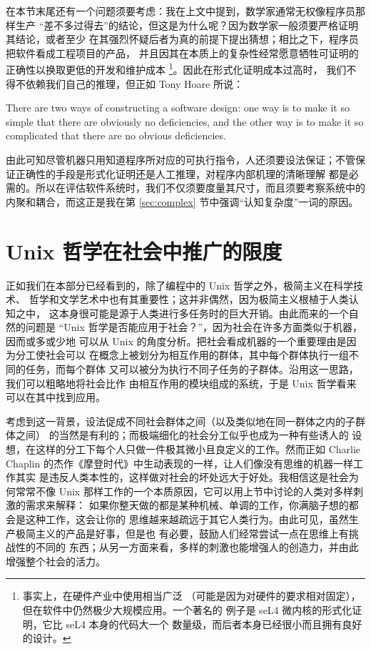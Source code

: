 在本节末尾还有一个问题须要考虑：我在上文中提到，数学家通常无权像程序员那样生产
“差不多过得去”的结论，但这是为什么呢？因为数学家一般须要严格证明其结论，或者至少
在其强烈怀疑后者为真的前提下提出猜想；相比之下，程序员把软件看成工程项目的产品，
并且因其在本质上的复杂性经常愿意牺牲可证明的正确性以换取更低的开发和维护成本%
\footnote{\label{fn:formal}事实上，在硬件产业中使用相当广泛
（可能是因为对硬件的要求相对固定），但在软件中仍然极少大规模应用。一个著名的
例子是 seL4 微内核的形式化证明，它比 seL4 本身的代码大一个
数量级，而后者本身已经很小而且拥有良好的设计。}。因此在形式化证明成本过高时，
我们不得不依赖我们自己的推理，但正如 Tony Hoare 所说：
\begin{quoting}
	There are two ways of constructing a software design: one way is to make
	it so simple that there are obviously no deficiencies, and the other way
	is to make it so complicated that there are no obvious deficiencies.
\end{quoting}
由此可知尽管机器只用知道程序所对应的可执行指令，人还须要设法保证；不管保证正确性的手段是形式化证明还是人工推理，对程序内部机理的清晰理解
都是必需的。所以在评估软件系统时，我们不仅须要度量其尺寸，而且须要考察系统中的
内聚和耦合，而这正是我在第 \ref{sec:complex} 节中强调“认知复杂度”一词的原因。

\section{Unix 哲学在社会中推广的限度}\label{sec:society}

正如我们在本部分已经看到的，除了编程中的 Unix 哲学之外，极简主义在科学技术、
哲学和文学艺术中也有其重要性；这并非偶然，因为极简主义根植于人类认知之中，
这本身很可能是源于人类进行多任务时的巨大开销。由此而来的一个自然的问题是
“Unix 哲学是否能应用于社会？”，因为社会在许多方面类似于机器，因而或多或少地
可以从 Unix 的角度分析。把社会看成机器的一个重要理由是因为分工使社会可以
在概念上被划分为相互作用的群体，其中每个群体执行一组不同的任务，而每个群体
又可以被分为执行不同子任务的子群体。沿用这一思路，我们可以粗略地将社会比作
由相互作用的模块组成的系统，于是 Unix 哲学看来可以在其中找到应用。

考虑到这一背景，设法促成不同社会群体之间（以及类似地在同一群体之内的子群体之间）
的当然是有利的；而极端细化的社会分工似乎也成为一种有些诱人的
设想，在这样的分工下每个人只做一件极其微小且良定义的工作。然而正如 Charlie
Chaplin 的杰作《摩登时代》中生动表现的一样，让人们像没有思维的机器一样工作其实
是违反人类本性的，这样做对社会的坏处远大于好处。我相信这是社会为何常常不像
Unix 那样工作的一个本质原因，它可以用上节中讨论的人类对多样刺激的需求来解释：
如果你整天做的都是某种机械、单调的工作，你满脑子想的都会是这种工作，这会让你的
思维越来越疏远于其它人类行为。由此可见，虽然生产极简主义的产品是好事，但是也
有必要，鼓励人们经常尝试一点在思维上有挑战性的不同的
东西；从另一方面来看，多样的刺激也能增强人的创造力，并由此增强整个社会的活力。

